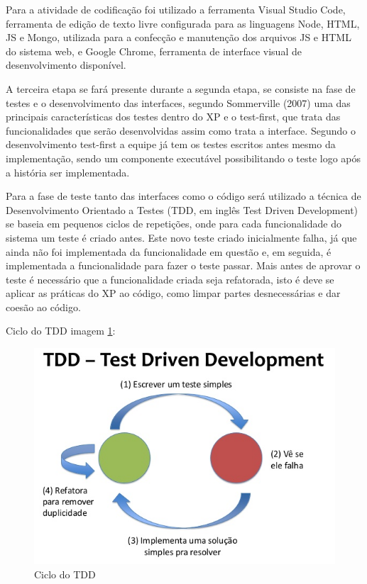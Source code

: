\documentclass{automatextcc}
\begin{document}
Para a atividade de codificação foi utilizado a ferramenta Visual Studio Code, ferramenta de edição de texto livre configurada para as linguagens Node, HTML, JS e Mongo, utilizada para a confecção e manutenção dos arquivos JS e HTML do sistema web, e Google Chrome, ferramenta de interface visual de desenvolvimento disponível.

A terceira etapa se fará presente durante a segunda etapa, se consiste na fase de testes e o desenvolvimento das interfaces, segundo Sommerville (2007) uma das principais características dos testes dentro do XP e o  test-first,  que trata das funcionalidades que serão desenvolvidas assim como trata a interface. Segundo o desenvolvimento test-first a equipe já tem os testes escritos antes mesmo da implementação, sendo um componente executável possibilitando o teste logo após a história ser implementada.


Para a fase de teste tanto das interfaces como o código será utilizado a técnica de Desenvolvimento Orientado a Testes (TDD, em inglês Test Driven Development)	se baseia em pequenos ciclos de repetições, onde para cada funcionalidade do sistema um teste é criado antes. Este novo teste criado inicialmente falha, já que ainda não foi implementada da funcionalidade em questão e, em seguida, é implementada a funcionalidade para fazer o teste passar. Mais antes de aprovar o teste é necessário que a funcionalidade criada seja refatorada, isto é deve se aplicar as práticas do XP ao código, como limpar partes desnecessárias e dar coesão ao código.  

Ciclo do TDD imagem \ref{img2}: 
 \begin{figure}[h!]
    \centering
	\includegraphics[scale=0.7]{tdd}
	\caption{Ciclo do TDD}
	\label{img2}
\end{figure}
\end{document}
